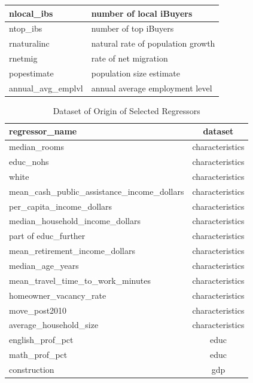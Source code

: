 \begin{table}[!htb]
\begin{tabular}{l|l}
    nlocal\_ibs &        number of local iBuyers \\ \hline
    ntop\_ibs &        number of top iBuyers \\ \hline
    rnaturalinc &       natural rate of population growth \\ \hline
    rnetmig &         rate of net migration \\ \hline
    popestimate &         population size estimate \\ \hline
    annual\_avg\_emplvl &            annual average employment level \\ \hline
    \end{tabular}
\end{table}

\begin{table}
    \centering
    \caption{Dataset of Origin of Selected Regressors}\label{regressor_origin}
    \begin{tabular}{| l || c |}
    \hline
    regressor\_name &          dataset \\
    \hline
    \hline
    median\_rooms &  characteristics \\ \hline
    educ\_nohs &  characteristics \\ \hline
    white &  characteristics \\ \hline
    mean\_cash\_public\_assistance\_income\_dollars &  characteristics \\ \hline
    per\_capita\_income\_dollars &  characteristics \\ \hline
    median\_household\_income\_dollars &  characteristics \\ \hline
    part of educ\_further &  characteristics \\ \hline
    mean\_retirement\_income\_dollars &  characteristics \\ \hline
    median\_age\_years &  characteristics \\ \hline
    mean\_travel\_time\_to\_work\_minutes &  characteristics \\ \hline
    homeowner\_vacancy\_rate &  characteristics \\ \hline
    move\_post2010 &  characteristics \\ \hline
    average\_household\_size &  characteristics \\ \hline
    english\_prof\_pct &             educ \\ \hline
    math\_prof\_pct &             educ \\ \hline
    construction &              gdp \\ \hline

\end{tabular}
\end{table}
